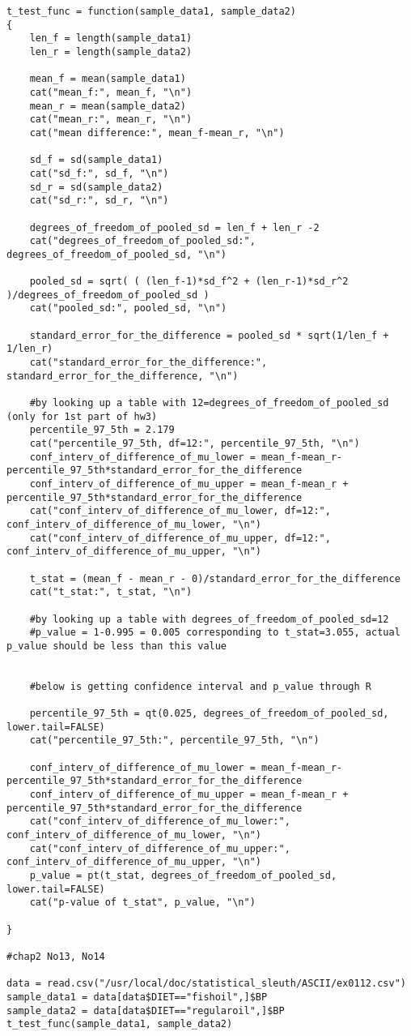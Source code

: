 \documentclass[a4paper,10pt]{article}
\begin{document}
\begin{verbatim}
t_test_func = function(sample_data1, sample_data2)
{
	len_f = length(sample_data1)
	len_r = length(sample_data2)
	
	mean_f = mean(sample_data1)
	cat("mean_f:", mean_f, "\n")
	mean_r = mean(sample_data2)
	cat("mean_r:", mean_r, "\n")
	cat("mean difference:", mean_f-mean_r, "\n")
	
	sd_f = sd(sample_data1)
	cat("sd_f:", sd_f, "\n")
	sd_r = sd(sample_data2)
	cat("sd_r:", sd_r, "\n")
	
	degrees_of_freedom_of_pooled_sd = len_f + len_r -2
	cat("degrees_of_freedom_of_pooled_sd:", degrees_of_freedom_of_pooled_sd, "\n")
	
	pooled_sd = sqrt( ( (len_f-1)*sd_f^2 + (len_r-1)*sd_r^2  )/degrees_of_freedom_of_pooled_sd )
	cat("pooled_sd:", pooled_sd, "\n")
	
	standard_error_for_the_difference = pooled_sd * sqrt(1/len_f + 1/len_r)
	cat("standard_error_for_the_difference:", standard_error_for_the_difference, "\n")
	
	#by looking up a table with 12=degrees_of_freedom_of_pooled_sd (only for 1st part of hw3)
	percentile_97_5th = 2.179
	cat("percentile_97_5th, df=12:", percentile_97_5th, "\n")
	conf_interv_of_difference_of_mu_lower = mean_f-mean_r- percentile_97_5th*standard_error_for_the_difference
	conf_interv_of_difference_of_mu_upper = mean_f-mean_r + percentile_97_5th*standard_error_for_the_difference
	cat("conf_interv_of_difference_of_mu_lower, df=12:", conf_interv_of_difference_of_mu_lower, "\n")
	cat("conf_interv_of_difference_of_mu_upper, df=12:", conf_interv_of_difference_of_mu_upper, "\n")
	
	t_stat = (mean_f - mean_r - 0)/standard_error_for_the_difference
	cat("t_stat:", t_stat, "\n")
	
	#by looking up a table with degrees_of_freedom_of_pooled_sd=12
	#p_value = 1-0.995 = 0.005 corresponding to t_stat=3.055, actual p_value should be less than this value
	
	
	#below is getting confidence interval and p_value through R
	
	percentile_97_5th = qt(0.025, degrees_of_freedom_of_pooled_sd, lower.tail=FALSE)
	cat("percentile_97_5th:", percentile_97_5th, "\n")
	
	conf_interv_of_difference_of_mu_lower = mean_f-mean_r- percentile_97_5th*standard_error_for_the_difference
	conf_interv_of_difference_of_mu_upper = mean_f-mean_r + percentile_97_5th*standard_error_for_the_difference
	cat("conf_interv_of_difference_of_mu_lower:", conf_interv_of_difference_of_mu_lower, "\n")
	cat("conf_interv_of_difference_of_mu_upper:", conf_interv_of_difference_of_mu_upper, "\n")
	p_value = pt(t_stat, degrees_of_freedom_of_pooled_sd, lower.tail=FALSE)
	cat("p-value of t_stat", p_value, "\n")

}

#chap2 No13, No14

data = read.csv("/usr/local/doc/statistical_sleuth/ASCII/ex0112.csv")
sample_data1 = data[data$DIET=="fishoil",]$BP
sample_data2 = data[data$DIET=="regularoil",]$BP
t_test_func(sample_data1, sample_data2)
\end{verbatim}
\end{document}
